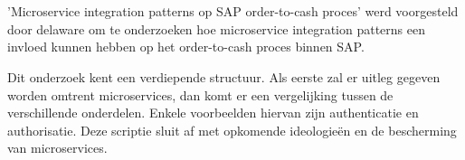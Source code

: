 
%
%

%



\chapter*{}


'Microservice integration patterns op SAP order-to-cash proces' werd voorgesteld door delaware om te onderzoeken hoe microservice integration patterns een invloed kunnen hebben op het order-to-cash proces binnen SAP. 

Dit onderzoek kent een verdiepende structuur. Als eerste zal er uitleg gegeven worden  omtrent microservices, dan komt er een vergelijking tussen de verschillende onderdelen. Enkele voorbeelden hiervan zijn authenticatie en authorisatie. Deze scriptie sluit af met opkomende ideologieën en de bescherming van microservices.

